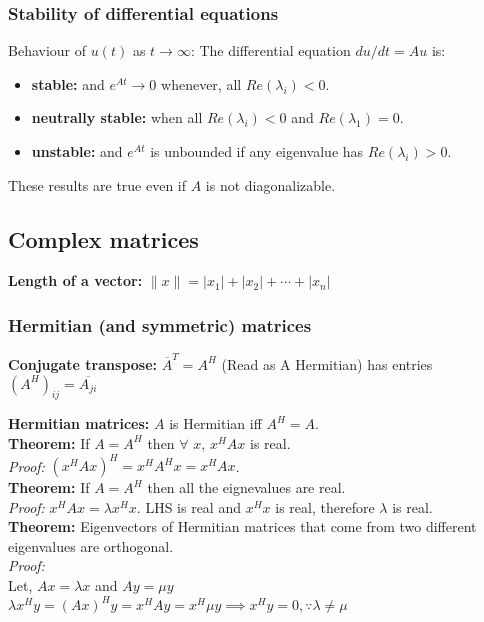 \subsubsection{Stability of differential equations}
Behaviour of $u(t)$ as $t \to \infty$:
The differential equation $du/dt = Au$ is:\\
\begin{itemize}
\item \textbf{stable:} and $e^{At} \to 0$ whenever, all $Re(\lambda_i) < 0$.	
\item \textbf{neutrally stable:} when all $Re(\lambda_i) < 0$ and $Re(\lambda_1) = 0$.
\item \textbf{unstable:} and $e^{At}$ is unbounded if any eigenvalue has $Re(\lambda_i) > 0$.
\end{itemize}
These results are true even if $A$ is not diagonalizable.


\subsection{Complex matrices}

\textbf{Length of a vector:} $\|x\| = |x_1| + |x_2| + \cdots + |x_n|$\\

\subsubsection{Hermitian (and symmetric) matrices}

\textbf{Conjugate transpose:} $\overline{A}^T = A^H$ (Read as A Hermitian) has entries $(A^H)_{ij} = \overline {A_{ji}}$

\textbf{Hermitian matrices:} $A$ is Hermitian iff $A^H = A$.\\

\textbf{Theorem:} If $A = A^H$ then $\forall$ $x$, $x^HAx$ is real.\\
\textit{Proof:} $(x^HAx)^H = x^HA^Hx = x^HAx$.\\

\textbf{Theorem:} If $A = A^H$ then all the eignevalues are real.\\
\textit{Proof:} $x^HAx = \lambda x^Hx$. LHS is real and $x^Hx$ is real, therefore $\lambda$ is real.\\

\textbf{Theorem:} Eigenvectors of Hermitian matrices that come from two different eigenvalues are orthogonal.\\
\textit{Proof:} \\
Let, $Ax = \lambda x$ and $Ay = \mu y$\\
$\lambda x^Hy = (Ax)^Hy = x^HAy = x^H \mu y \implies x^Hy = 0, \because \lambda \neq \mu$\\

